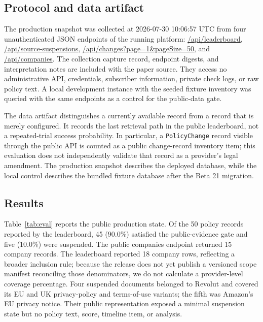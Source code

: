 \documentclass[11pt]{article}
\begin{document}
\subsection{Protocol and data artifact}

The production snapshot was collected at 2026-07-30 10:06:57 UTC from four
unauthenticated JSON endpoints of the running platform:
\url{/api/leaderboard}, \url{/api/source-suspensions},
\url{/api/changes?page=1&pageSize=50}, and \url{/api/companies}. The collection
capture record, endpoint digests, and interpretation notes are included with the
paper source. They access no
administrative API, credentials, subscriber information, private check logs, or
raw policy text. A local development instance with the seeded fixture inventory
was queried with the same endpoints as a control for the public-data gate.

The data artifact distinguishes a currently available record from a record that
is merely configured. It records the last retrieval path in the public
leaderboard, not a repeated-trial success probability. In particular, a
\texttt{PolicyChange} record visible through the public API is counted as a
public change-record inventory item; this evaluation does not independently
validate that record as a provider's legal amendment. The production snapshot
describes the deployed database, while the local control describes the bundled
fixture database after the Beta 21 migration.

\subsection{Results}

Table~\ref{tab:eval} reports the public production state. Of the 50 policy
records reported by the leaderboard, 45 (90.0\%) satisfied the public-evidence
gate and five (10.0\%) were suspended. The public companies endpoint returned 15
company records. The leaderboard reported 18 company rows, reflecting a broader
inclusion rule; because the release does not yet publish a versioned scope
manifest reconciling those denominators, we do not calculate a provider-level
coverage percentage. Four suspended documents belonged to Revolut and covered
its EU and UK privacy-policy and terms-of-use variants; the fifth was Amazon's EU
privacy notice. Their public representation exposed a minimal suspension state
but no policy text, score, timeline item, or analysis.
\end{document}

